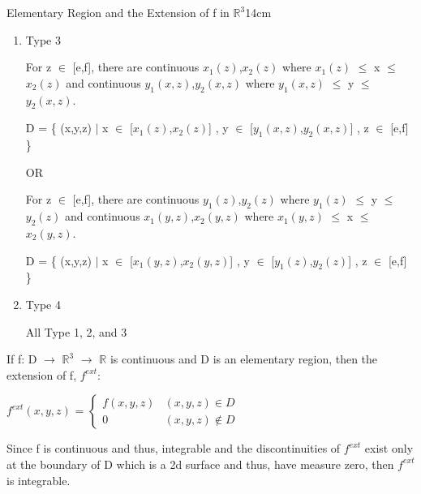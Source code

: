 \begin{definition}{Elementary Region and the Extension of f
    in $\mathbb{R}^3$}{14cm}
\begin{enumerate}[label=(\alph*), leftmargin=1cm, itemsep=0.1cm]
                \hspace{0.5cm}
                D = \{ (x,y,z) $|$ x $\in$ [$x_1(y,z)$,$x_2(y,z)$] , y $\in$ [c,d] ,
                                z $\in$ [$z_1(y)$,$z_2(y)$] \}

            \item {\color{red} Type 3}
            
                For z $\in$ [e,f], there are continuous $x_1(z)$,$x_2(z)$ where
                $x_1(z)$ $\leq$ x $\leq$ $x_2(z)$
                and continuous $y_1(x,z)$,$y_2(x,z)$ where
                $y_1(x,z)$ $\leq$ y $\leq$ $y_2(x,z)$.

                \hspace{0.5cm}
                D = \{ (x,y,z) $|$ x $\in$ [$x_1(z)$,$x_2(z)$] , 
                                y $\in$ [$y_1(x,z)$,$y_2(x,z)$] ,
                                z $\in$ [e,f] \}

                OR

                For z $\in$ [e,f], there are continuous $y_1(z)$,$y_2(z)$ where
                $y_1(z)$ $\leq$ y $\leq$ $y_2(z)$
                and continuous $x_1(y,z)$,$x_2(y,z)$ where
                $x_1(y,z)$ $\leq$ x $\leq$ $x_2(y,z)$.

                \hspace{0.5cm}
                D = \{ (x,y,z) $|$ x $\in$ [$x_1(y,z)$,$x_2(y,z)$] , 
                                y $\in$ [$y_1(z)$,$y_2(z)$] ,
                                z $\in$ [e,f] \}

            \item {\color{red} Type 4}
            
                All Type 1, 2, and 3
        \end{enumerate}

        \vspace{0.3cm}

        If f: D $\rightarrow$ $\mathbb{R}^3$ $\rightarrow$ $\mathbb{R}$
        is continuous and D is an elementary region, then
        the extension of f, $f^{ext}$:

        \hspace{0.5cm}
        $f^{ext}(x,y,z)$ =
        $
        \begin{cases}
            f(x,y,z) & (x,y,z) \in D \\
            0 & (x,y,z) \not \in D
        \end{cases}
        $

        Since f is continuous and thus, integrable and the discontinuities of
        $f^{ext}$ exist only at the boundary of D which is a 2d surface and thus,
        have measure zero, then $f^{ext}$ is integrable.
    \end{definition}

